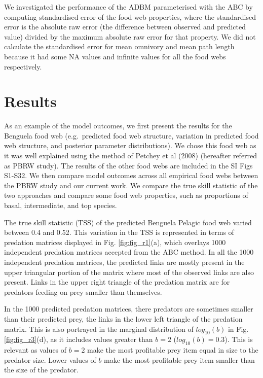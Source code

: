 \documentclass{article}
\begin{document}
We investigated the performance of the ADBM parameterised with the ABC
by computing standardised error of the food web properties, where the
standardised error is the absolute raw error (the difference between
observed and predicted value) divided by the maximum absolute raw error
for that property. We did not calculate the standardised error for mean
omnivory and mean path length because it had some NA values and infinite
values for all the food webs respectively.

\hypertarget{results}{%
\section{Results}\label{results}}

As an example of the model outcomes, we first present the results for
the Benguela food web (e.g.~predicted food web structure, variation in
predicted food web structure, and posterior parameter distributions). We
chose this food web as it was well explained using the method of Petchey
et al (2008) (hereafter referred as PBRW study). The results of the
other food webs are included in the SI Figs S1-S32. We then compare
model outcomes across all empirical food webs between the PBRW study and
our current work. We compare the true skill statistic of the two
approaches and compare some food web properties, such as proportions of
basal, intermediate, and top species.

The true skill statistic (TSS) of the predicted Benguela Pelagic food
web varied between 0.4 and 0.52. This variation in the TSS is
represented in terms of predation matrices displayed in Fig.
\ref{fig:fig_r1}(a), which overlays 1000 independent predation matrices
accepted from the ABC method. In all the 1000 independent predation
matrices, the predicted links are mostly present in the upper triangular
portion of the matrix where most of the observed links are also present.
Links in the upper right triangle of the predation matrix are for
predators feeding on prey smaller than themselves.

In the 1000 predicted predation matrices, there predators are sometimes
smaller than their predicted prey, the links in the lower left triangle
of the predation matrix. This is also portrayed in the marginal
distribution of \(log_{10}(b)\) in Fig. \ref{fig:fig_r3}(d), as it
includes values greater than \(b=2\) (\(log_{10}(b)=0.3\)). This is
relevant as values of \(b=2\) make the most profitable prey item equal
in size to the predator size. Lower values of \(b\) make the most
profitable prey item smaller than the size of the predator.
\end{document}
